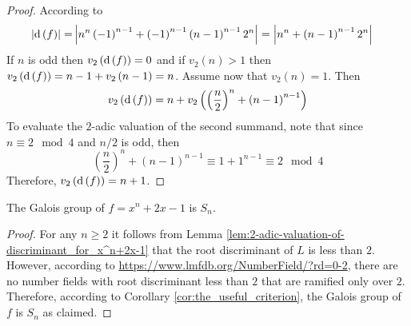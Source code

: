 \documentclass[../main.tex]{subfiles}
\begin{document}
\begin{proof}
  According to \cite[Theorem 2]{Swan62} 
  \begin{align*}
    \left| \operatorname{\rm d}\left( f \right) \right| = &
    \left| 
      n^n\left( -1 \right)^{n-1} + \left( -1 \right)^{n-1}\left( n-1 \right)^{n-1}2^n 
    \right| =
    \left|
      n^n + \left( n-1 \right)^{n-1}2^n
    \right| 
  \end{align*}
  If $n$ is odd then $v_2\left( \operatorname{\rm d}\left( f \right) \right) = 0$ and if $v_2\left( n \right) > 1$ then $v_2\left( \operatorname{\rm d}\left( f \right) \right) = n - 1 + v_2\left( n - 1 \right) = n$.
  Assume now that $v_2\left( n \right) = 1$.
  Then 
  \[
    v_2\left( \operatorname{\rm d}\left( f \right) \right) = 
    n + v_2\left(  
      \left( \frac{n}{2} \right)^n + \left( n - 1 \right)^{n-1}
    \right)
  \]
  To evaluate the $2$-adic valuation of the second summand, note that since $n \equiv 2 \mod 4$ and $n/2$ is odd, then 
  \[
    \left( \frac{n}{2} \right)^n + \left( n - 1 \right)^{n-1} \equiv 
    1 + 1^{n-1} \equiv 2 \mod 4
  \]
  Therefore, $v_2\left( \operatorname{\rm d}\left( f \right) \right) = n + 1$.
\end{proof}

\begin{corollary}
  The Galois group of $f = x^n + 2x - 1$ is $S_n$.
\end{corollary}
\begin{proof}
  For any $n \geq 2$ it follows from Lemma \ref{lem:2-adic-valuation-of-discriminant_for_x^n+2x-1} that the root discriminant of $L$ is less than $2$.
  However, according to \url{https://www.lmfdb.org/NumberField/?rd=0-2}, there are no number fields with root discriminant less than $2$ that are ramified only over $2$.
  Therefore, according to Corollary \ref{cor:the_useful_criterion}, the Galois group of $f$ is $S_n$ as claimed.
\end{proof}
\end{document}
